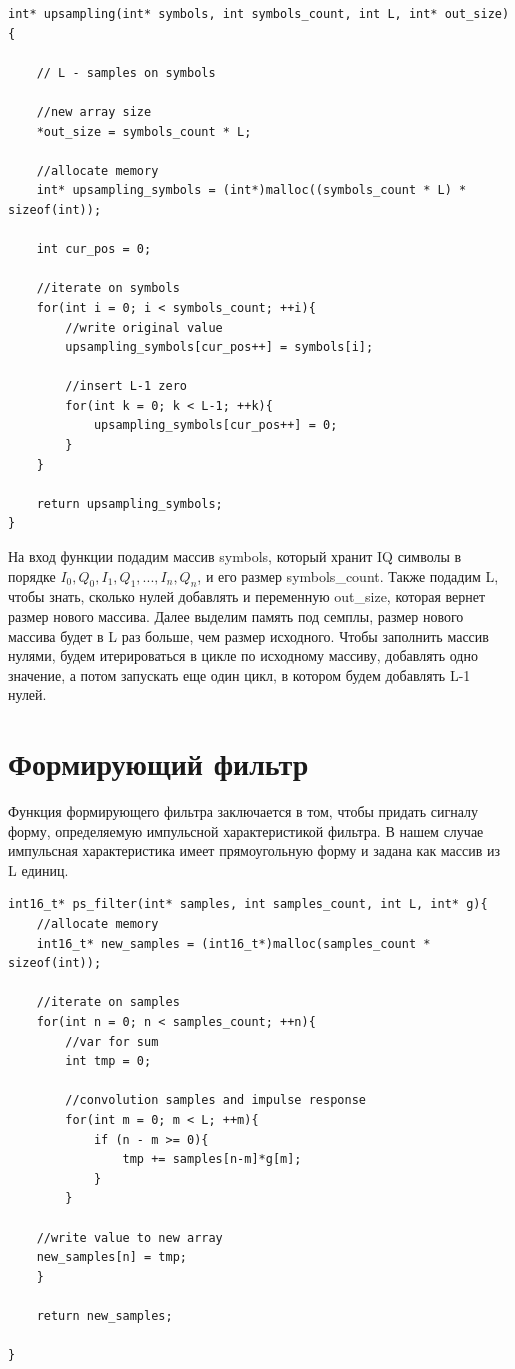 \begin{lstlisting}
int* upsampling(int* symbols, int symbols_count, int L, int* out_size){

    // L - samples on symbols

    //new array size
    *out_size = symbols_count * L;

    //allocate memory
    int* upsampling_symbols = (int*)malloc((symbols_count * L) * sizeof(int));

    int cur_pos = 0;

    //iterate on symbols
    for(int i = 0; i < symbols_count; ++i){
        //write original value
        upsampling_symbols[cur_pos++] = symbols[i];

        //insert L-1 zero
        for(int k = 0; k < L-1; ++k){
            upsampling_symbols[cur_pos++] = 0;
        }
    }

    return upsampling_symbols;
}
\end{lstlisting}

На вход функции подадим массив symbols, который хранит IQ символы в порядке $I_0, Q_0, I_1, Q_1, ... ,I_n, Q_n$, и его размер symbols\_count.
Также подадим L, чтобы знать, сколько нулей добавлять и переменную out\_size, которая вернет размер нового массива. Далее выделим память
под семплы, размер нового массива будет в L раз больше, чем размер исходного. Чтобы заполнить массив нулями, будем итерироваться в цикле по 
исходному массиву, добавлять одно значение, а потом запускать еще один цикл, в котором будем добавлять L-1 нулей.

\section{Формирующий фильтр}

Функция формирующего фильтра заключается в том, чтобы придать сигналу форму, определяемую импульсной характеристикой фильтра. В 
нашем случае импульсная характеристика имеет прямоугольную форму и задана как массив из L единиц.

\begin{lstlisting}
int16_t* ps_filter(int* samples, int samples_count, int L, int* g){
    //allocate memory
    int16_t* new_samples = (int16_t*)malloc(samples_count * sizeof(int)); 

    //iterate on samples
    for(int n = 0; n < samples_count; ++n){
        //var for sum
        int tmp = 0;

        //convolution samples and impulse response
        for(int m = 0; m < L; ++m){
            if (n - m >= 0){
                tmp += samples[n-m]*g[m];
            }
        }

    //write value to new array
    new_samples[n] = tmp;
    }

    return new_samples;

}
\end{lstlisting}

